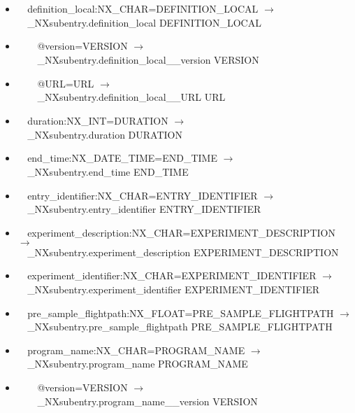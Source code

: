 \documentclass[11pt]{article}
\begin{document}
{{\begin{itemize}
\item{\verb|  |definition\_local:NX\_CHAR=DEFINITION\_LOCAL $\rightarrow$\\
\verb|  |\_NXsubentry.definition\_local DEFINITION\_LOCAL}

\item{\verb|    |@version=VERSION $\rightarrow$\\
\verb|    |\_NXsubentry.definition\_local\_\_version VERSION}

\item{\verb|    |@URL=URL $\rightarrow$\\
\verb|    |\_NXsubentry.definition\_local\_\_URL URL}

\item{\verb|  |duration:NX\_INT=DURATION $\rightarrow$\\
\verb|  |\_NXsubentry.duration DURATION}

\item{\verb|  |end\_time:NX\_DATE\_TIME=END\_TIME $\rightarrow$\\
\verb|  |\_NXsubentry.end\_time END\_TIME}

\item{\verb|  |entry\_identifier:NX\_CHAR=ENTRY\_IDENTIFIER $\rightarrow$\\
\verb|  |\_NXsubentry.entry\_identifier ENTRY\_IDENTIFIER}

\item{\verb|  |experiment\_description:NX\_CHAR=EXPERIMENT\_DESCRIPTION $\rightarrow$\\
\verb|  |\_NXsubentry.experiment\_description EXPERIMENT\_DESCRIPTION}

\item{\verb|  |experiment\_identifier:NX\_CHAR=EXPERIMENT\_IDENTIFIER $\rightarrow$\\
\verb|  |\_NXsubentry.experiment\_identifier EXPERIMENT\_IDENTIFIER}

\item{\verb|  |pre\_sample\_flightpath:NX\_FLOAT=PRE\_SAMPLE\_FLIGHTPATH $\rightarrow$\\
\verb|  |\_NXsubentry.pre\_sample\_flightpath PRE\_SAMPLE\_FLIGHTPATH}

\item{\verb|  |program\_name:NX\_CHAR=PROGRAM\_NAME $\rightarrow$\\
\verb|  |\_NXsubentry.program\_name PROGRAM\_NAME}

\item{\verb|    |@version=VERSION $\rightarrow$\\
\verb|    |\_NXsubentry.program\_name\_\_version VERSION}


\end{itemize}}}
\end{document}

